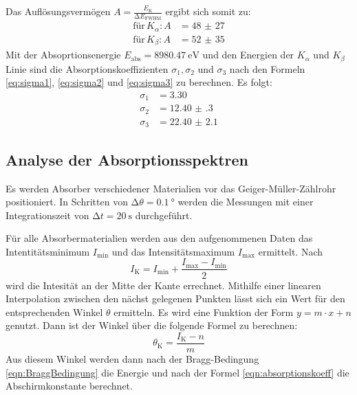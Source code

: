   Das Auflösungsvermögen $A = \frac{E_{\text{K}}}{\increment E_{\text{FWHM}}}$ ergibt sich somit zu:
  \begin{align*}
    \text{für} \, K_{\alpha}: A&= \num{48(27)}\\
    \text{für} \, K_{\beta}: A&= \num{52(35)}
  \end{align*}
  Mit der Absoprtionsenergie $E_{\text{abs}} = \SI{8980.47}{\electronvolt}$ \cite{E_abs} und den Energien der $K_{\alpha}$ und $K_{\beta}$ Linie sind die 
  Absorptionskoeffizienten $\sigma_1, \sigma_2$ und $\sigma_3$ nach den Formeln \eqref{eq:sigma1}, \eqref{eq:sigma2} und \eqref{eq:sigma3} zu berechnen.
  Es folgt:
  \begin{align*}
    \sigma_1 &= \num{3.30}\\
    \sigma_2 &= \num{12.40(30)}\\
    \sigma_3 &= \num{22.40(210)}
  \end{align*}


\subsection{Analyse der Absorptionsspektren}\label{sec:Analyse Absorptionsspektrum}

  Es werden Absorber verschiedener Materialien vor das Geiger-Müller-Zählrohr positioniert. In Schritten von $\increment \theta = \SI{0.1}{\degree}$ werden die Messungen
  mit einer Integrationszeit von $\increment t = \SI{20}{\second}$ durchgeführt.

  \noindent Für alle Absorbermaterialien werden aus den aufgenommenen Daten das Intentitätsminimum $I_{\text{min}}$ und das Intensitätsmaximum $I_{\text{max}}$ 
  ermittelt. Nach 
  \begin{equation*}
    I_{\text{K}} = I_{\text{min}} + \frac{I_{\text{max}} - I_{\text{min}}}{2}
  \end{equation*}
  wird die Intesität an der Mitte der Kante errechnet. Mithilfe einer linearen Interpolation zwischen den nächst gelegenen Punkten lässt sich ein Wert für
  den entsprechenden Winkel $\theta$ ermitteln. Es wird eine Funktion der Form $y = m \cdot x + n$ genutzt. Dann ist der Winkel über 
  die folgende Formel zu berechnen: 
  \begin{equation*}
   \theta_{\text{K}} = \frac{I_{\text{K}} - n}{m} 
  \end{equation*}
  Aus diesem Winkel werden dann nach der Bragg-Bedingung \eqref{eqn:BraggBedingung} die Energie und nach der Formel 
  \eqref{eqn:absorptionskoeff} die Abschirmkonstante berechnet. 

